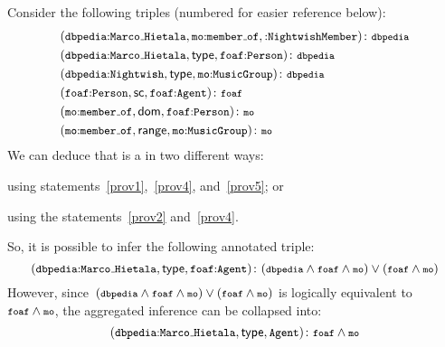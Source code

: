 \begin{example}
  Consider the following triples (numbered for easier reference below):
  {\allowdisplaybreaks
  \begin{align}
    &\fuzzyg{\triple{\qname{dbpedia}{Marco\mathunderscore{}Hietala}, \qname{mo}{member\mathunderscore{}of}, \qname{}{NightwishMember}}}{\texttt{\footnotesize dbpedia}}\label{prov1}\\
    &\fuzzyg{\triple{\qname{dbpedia}{Marco\mathunderscore{}Hietala}, \typeR, \qname{foaf}{Person}}}{\texttt{\footnotesize dbpedia}}\label{prov2}\\
    &\fuzzyg{\triple{\qname{dbpedia}{Nightwish},\typeR, \qname{mo}{MusicGroup}}}{\texttt{\footnotesize dbpedia}}\label{prov3}\\
    &\fuzzyg{\triple{\qname{foaf}{Person}, \subclass, \qname{foaf}{Agent}}}{\texttt{\footnotesize foaf}} \label{prov4}\\
    &\fuzzyg{\triple{\qname{mo}{member\mathunderscore{}of}, \domR, \qname{foaf}{Person}}}{\texttt{\footnotesize mo}} \label{prov5}\\
    &\fuzzyg{\triple{\qname{mo}{member\mathunderscore{}of}, \range, \qname{mo}{MusicGroup}}}{\texttt{\footnotesize mo}}\label{prov6}
  \end{align}%
  }%
  We can deduce that  is a  in two different ways:
  \begin{enumerate*}[noitemsep,label=(\alph*)]
  \item using statements~\eqref{prov1},~\eqref{prov4}, and~\eqref{prov5}; or
  \item using the statements~\eqref{prov2} and~\eqref{prov4}.
  \end{enumerate*}
  So, it is possible to infer the following annotated triple:
  \[
  \fuzzyg{\triple{\qname{dbpedia}{Marco\mathunderscore{}Hietala}, \typeR, \qname{foaf}{Agent}}}{(\texttt{\footnotesize
      dbpedia}\land\texttt{\footnotesize foaf}\land\texttt{\footnotesize mo})\lor(\texttt{\footnotesize
      foaf}\land\texttt{\footnotesize mo})}
  \]
  However, since~$(\texttt{\footnotesize dbpedia}\land\texttt{\footnotesize foaf}\land\texttt{\footnotesize
    mo})\lor(\texttt{\footnotesize foaf}\land\texttt{\footnotesize mo})$ is logically equivalent
  to~$\texttt{\footnotesize foaf}\land\texttt{\footnotesize mo}$, the aggregated inference can be collapsed into:
  \[
  \fuzzyg{\triple{\qname{dbpedia}{Marco\mathunderscore{}Hietala}, \typeR, \uri{Agent}}}{\texttt{\footnotesize
      foaf}\land\texttt{\footnotesize mo}}
  \]
\end{example}


